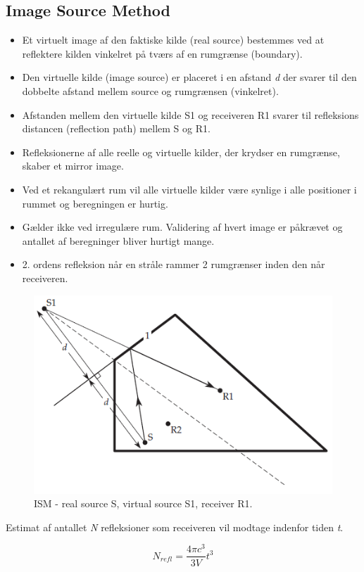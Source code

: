 \subsection{Image Source Method}
\begin{itemize}
	\item Et virtuelt image af den faktiske kilde (real source) bestemmes ved at reflektere kilden vinkelret på tværs af en rumgrænse (boundary).
	\item Den virtuelle kilde (image source) er placeret i en afstand \textit{d} der svarer til den dobbelte afstand mellem source og rumgrænsen (vinkelret).
	\item Afstanden mellem den virtuelle kilde S1 og receiveren R1 svarer til refleksions distancen (reflection path) mellem S og R1.
	\item Refleksionerne af alle reelle og virtuelle kilder, der krydser en rumgrænse, skaber et mirror image.
	\item Ved et rekangulært rum vil alle virtuelle kilder være synlige i alle positioner i rummet og beregningen er hurtig.
	\item Gælder ikke ved irregulære rum. Validering af hvert image er påkrævet og antallet af beregninger bliver hurtigt mange.
	\item 2. ordens refleksion når en stråle rammer 2 rumgrænser inden den når receiveren.
\end{itemize}

\begin{figure} [H]
	\centering
	\includegraphics[width=.75\linewidth]{graphics/18.png}
	\caption{ISM - real source S, virtual source S1, receiver R1.}
	\label{fig:18}
\end{figure}

\noindent Estimat af antallet \textit{N} refleksioner som receiveren vil modtage indenfor tiden \textit{t}.

\begin{equation}
N_{refl}=\dfrac{4\pi c^3}{3V}t^3
\end{equation}

